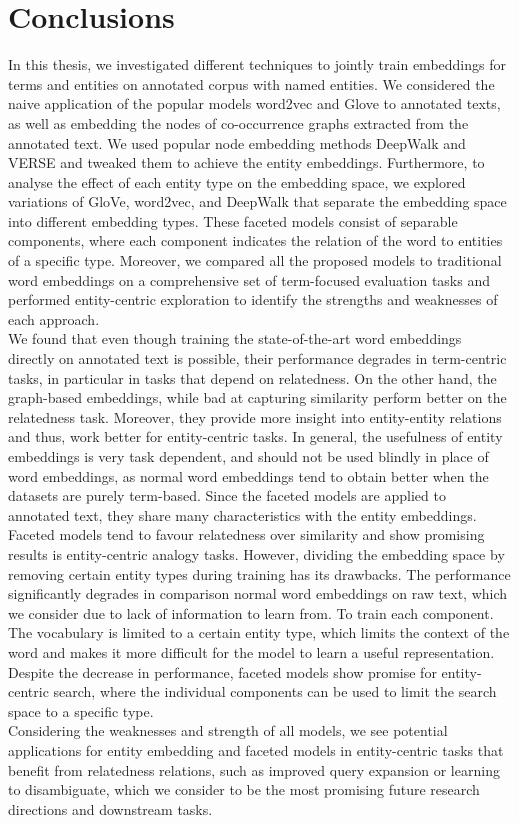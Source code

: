 \chapter{Conclusions}\label{chap:concl}

In this thesis, we investigated different techniques to jointly train embeddings for terms and entities on annotated corpus with named entities. We considered the naive application of the popular models word2vec and Glove to annotated texts, as well as embedding the nodes of co-occurrence graphs extracted from the annotated text. We used popular node embedding methods DeepWalk and VERSE and tweaked them to achieve the entity embeddings. Furthermore, to analyse the effect of each entity type on the embedding space, we explored variations of GloVe, word2vec, and DeepWalk that separate the embedding space into different embedding types. These faceted models consist of separable components, where each component indicates the relation of the word to entities of a specific type. Moreover, we compared all the proposed models to traditional word embeddings on a comprehensive set of term-focused evaluation tasks and performed entity-centric exploration to identify the strengths and weaknesses of each approach. \\
We found that even though training the state-of-the-art word embeddings directly on annotated text is possible, their performance degrades in term-centric tasks, in particular in tasks that depend on relatedness. On the other hand, the graph-based embeddings, while bad at capturing similarity perform better on the relatedness task. Moreover, they provide more insight into entity-entity relations and thus, work better for entity-centric tasks. In general, the usefulness of entity embeddings is very task dependent, and should not be used blindly in place of word embeddings, as normal word embeddings tend to obtain better when the datasets are purely term-based. Since the faceted models are applied to annotated text, they share many characteristics with the entity embeddings. Faceted models tend to favour relatedness over similarity and show promising results is entity-centric analogy tasks. However, dividing the embedding space by removing certain entity types during training has its drawbacks. The performance significantly degrades in comparison normal word embeddings on raw text, which we consider due to lack of information to learn from. To train each component. The vocabulary is limited to a certain entity type, which limits the context of the word and makes it more difficult for the model to learn a useful representation. Despite the decrease in performance, faceted models show promise for entity-centric search, where the individual components can be used to limit the search space to a specific type. \\
Considering the weaknesses and strength of all models, we see potential applications for entity embedding and faceted models in entity-centric tasks that benefit from relatedness relations, such as improved query expansion or learning to disambiguate, which we consider to be the most promising future research directions and downstream tasks.\\